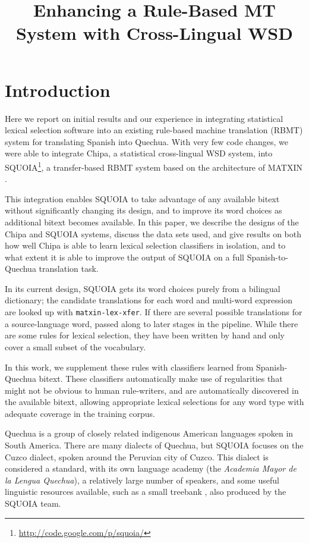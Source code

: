 \documentclass[10pt, a4paper]{article}
\title{Enhancing a Rule-Based MT System with Cross-Lingual WSD}
\begin{document}
\maketitleabstract

\section{Introduction}
Here we report on initial results and our experience in integrating statistical
lexical selection software into an existing rule-based machine translation
(RBMT) system for translating Spanish into Quechua.
With very few code changes, we were able to integrate Chipa, a statistical
cross-lingual WSD system, into
SQUOIA\footnote{\url{http://code.google.com/p/squoia/}},
a transfer-based RBMT system based on the architecture of MATXIN
\cite{matxin_2005,matxin}.

This integration enables SQUOIA to take advantage of any available bitext
without significantly changing its design, and to improve its word choices as
additional bitext becomes available.
In this paper, we describe the designs of the Chipa and SQUOIA systems, discuss
the data sets used, and give results on both how well Chipa is able to learn
lexical selection classifiers in isolation, and to what extent it is able to
improve the output of SQUOIA on a full Spanish-to-Quechua translation task.

In its current design, SQUOIA gets its word choices purely from a bilingual
dictionary; the candidate translations for each word and multi-word expression
are looked up with \texttt{matxin-lex-xfer}. If there are several possible
translations for a source-language word, passed along to later stages in the
pipeline. While there are some rules for lexical selection, they have
been written by hand and only cover a small subset of the vocabulary.

In this work, we supplement these rules with classifiers learned from
Spanish-Quechua bitext. These classifiers automatically make use of
regularities that might not be obvious to human rule-writers, and are
automatically discovered in the available bitext, allowing appropriate lexical
selections for any word type with adequate coverage in the training corpus.

Quechua is a group of closely related indigenous American languages spoken in
South America. There are many dialects of Quechua, but SQUOIA focuses on
the Cuzco dialect, spoken around the Peruvian city of Cuzco.
This dialect is considered a standard, with its own language academy
(the \emph{Academia Mayor de la Lengua Quechua}), a relatively large number of
speakers, and some useful linguistic resources available, such as a small
treebank \cite{rios2009quechua}, also produced by the SQUOIA team.
\end{document}
